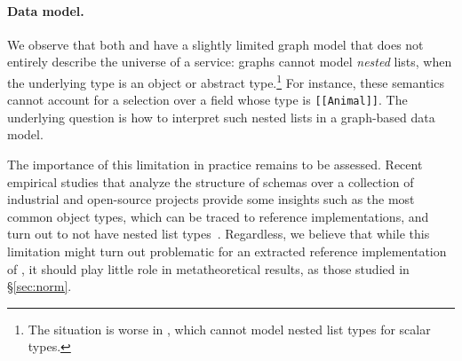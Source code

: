 \paragraph{Data model.} We observe that both \HP
and \gcoql have a slightly limited graph model that does not entirely describe the universe of a \gql service: graphs cannot model {\em nested} lists, when the underlying type is an object or abstract type.\footnote{The situation is worse in \HP, which cannot model nested list types for scalar types.}
For instance, these semantics cannot account for a selection over a field whose type is \texttt{[[Animal]]}.
%
The underlying question is how to interpret such nested lists in a graph-based data model.


The importance of this limitation in practice remains to be assessed. Recent empirical studies that analyze the structure of \gql schemas 
over a collection of industrial and open-source projects provide some 
insights such as the most 
common object types, which can be traced to reference implementations, and turn out to not have nested list types~\cite{empiricalgql,empiricalapi}. 
Regardless, we believe that while this limitation might turn out problematic for an extracted reference implementation of \gql, it should play little role in metatheoretical results, as those studied in \S\ref{sec:norm}.


